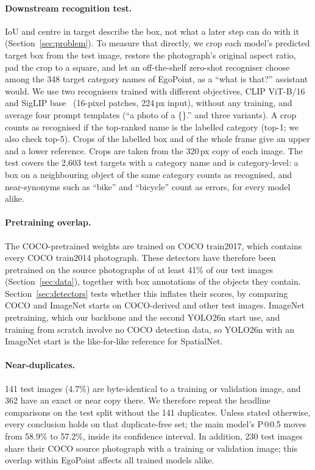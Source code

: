 \paragraph{Downstream recognition test.} IoU and centre in target describe the box, not what a later step can do with it (Section~\ref{sec:problem}). To measure that directly, we crop each model's predicted target box from the test image, restore the photograph's original aspect ratio, pad the crop to a square, and let an off-the-shelf zero-shot recogniser choose among the 348 target category names of EgoPoint, as a ``what is that?'' assistant would. We use two recognisers trained with different objectives, CLIP ViT-B/16~\cite{radford2021clip} and SigLIP base~\cite{zhai2023siglip} (16-pixel patches, 224\,px input), without any training, and average four prompt templates (``a photo of a \{\}.'' and three variants). A crop counts as recognised if the top-ranked name is the labelled category (top-1; we also check top-5). Crops of the labelled box and of the whole frame give an upper and a lower reference. Crops are taken from the 320\,px copy of each image. The test covers the 2,603 test targets with a category name and is category-level: a box on a neighbouring object of the same category counts as recognised, and near-synonyms such as ``bike'' and ``bicycle'' count as errors, for every model alike.

\paragraph{Pretraining overlap.} The COCO-pretrained weights are trained on COCO train2017, which contains every COCO train2014 photograph. These detectors have therefore been pretrained on the source photographs of at least 41\% of our test images (Section~\ref{sec:data}), together with box annotations of the objects they contain. Section~\ref{sec:detectors} tests whether this inflates their scores, by comparing COCO and ImageNet starts on COCO-derived and other test images. ImageNet pretraining, which our backbone and the second YOLO26n start use, and training from scratch involve no COCO detection data, so YOLO26n with an ImageNet start is the like-for-like reference for SpatialNet.

\paragraph{Near-duplicates.} 141 test images (4.7\%) are byte-identical to a training or validation image, and 362 have an exact or near copy there. We therefore repeat the headline comparisons on the test split without the 141 duplicates. Unless stated otherwise, every conclusion holds on that duplicate-free set; the main model's P@0.5 moves from 58.9\% to 57.2\%, inside its confidence interval. In addition, 230 test images share their COCO source photograph with a training or validation image; this overlap within EgoPoint affects all trained models alike.

